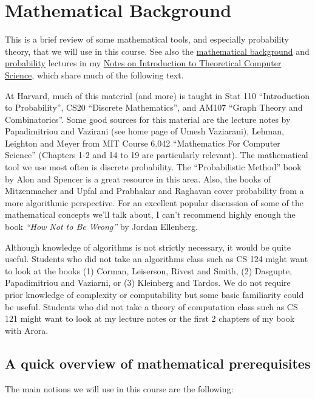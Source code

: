 \chapter{Mathematical Background}\label{Mathematical-Background}

This is a brief review of some mathematical tools, and especially
probability theory, that we will use in this course. See also the
\href{http://www.introtcs.org/public/lec_00_1_math_background.pdf}{mathematical
background} and
\href{http://www.introtcs.org/public/lec_15_probability.pdf}{probability}
lectures in my \href{http://www.introtcs.org/}{Notes on Introduction to
Theoretical Computer Science}, which share much of the following text.

At Harvard, much of this material (and more) is taught in Stat 110
``Introduction to Probability'', CS20 ``Discrete Mathematics'', and
AM107 ``Graph Theory and Combinatorics''. Some good sources for this
material are the lecture notes by Papadimitriou and Vazirani (see home
page of Umesh Vaziarani), Lehman, Leighton and Meyer from MIT Course
6.042 ``Mathematics For Computer Science'' (Chapters 1-2 and 14 to 19
are particularly relevant). The mathematical tool we use most often is
discrete probability. The ``Probabilistic Method'' book by Alon and
Spencer is a great resource in this area. Also, the books of
Mitzenmacher and Upfal and Prabhakar and Raghavan cover probability from
a more algorithmic perspective. For an excellent popular discussion of
some of the mathematical concepts we'll talk about, I can't recommend
highly enough the book \emph{``How Not to Be Wrong''} by Jordan
Ellenberg.

Although knowledge of algorithms is not strictly necessary, it would be
quite useful. Students who did not take an algorithms class such as CS
124 might want to look at the books (1) Corman, Leiserson, Rivest and
Smith, (2) Dasgupte, Papadimitriou and Vaziarni, or (3) Kleinberg and
Tardos. We do not require prior knowledge of complexity or computability
but some basic familiarity could be useful. Students who did not take a
theory of computation class such as CS 121 might want to look at my
lecture notes or the first 2 chapters of my book with Arora.

\section{A quick overview of mathematical
prerequisites}\label{A-quick-overview-of-mathe}

The main notions we will use in this course are the following:

